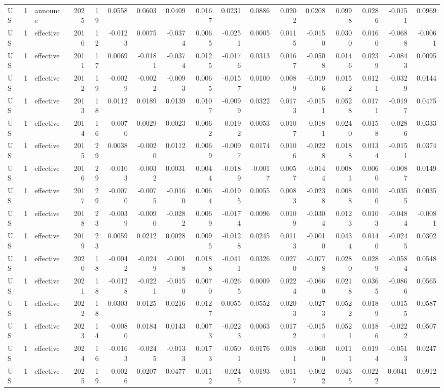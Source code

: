 \begin{tabular}{lrlrrrrrrrrrrrrrr}
US & 1 & announce & 2025 & 19 & 0.0558 & 0.0603 & 0.0409 & 0.0167 & 0.0231 & 0.0886 & 0.0202 & 0.0208 & 0.0998 & 0.0286 & -0.0151 & 0.0969 \\
US & 1 & effective & 2010 & 12 & -0.0123 & 0.0075 & -0.0374 & 0.0065 & -0.0251 & 0.0005 & 0.0115 & -0.0150 & 0.0300 & 0.0160 & -0.0688 & -0.0061 \\
US & 1 & effective & 2011 & 17 & 0.0069 & -0.0181 & -0.0374 & 0.0125 & -0.0176 & 0.0313 & 0.0167 & -0.0508 & 0.0146 & 0.0239 & -0.0843 & 0.0095 \\
US & 1 & effective & 2012 & 19 & -0.0029 & -0.0022 & -0.0093 & 0.0065 & -0.0157 & 0.0100 & 0.0089 & -0.0196 & 0.0152 & 0.0121 & -0.0329 & 0.0144 \\
US & 1 & effective & 2013 & 18 & 0.0112 & 0.0189 & 0.0139 & 0.0107 & -0.0099 & 0.0322 & 0.0173 & -0.0151 & 0.0528 & 0.0171 & -0.0197 & 0.0475 \\
US & 1 & effective & 2014 & 16 & -0.0070 & 0.0029 & 0.0023 & 0.0062 & -0.0192 & 0.0053 & 0.0107 & -0.0181 & 0.0240 & 0.0158 & -0.0286 & 0.0333 \\
US & 1 & effective & 2015 & 29 & 0.0038 & -0.0020 & 0.0112 & 0.0069 & -0.0097 & 0.0174 & 0.0106 & -0.0228 & 0.0188 & 0.0134 & -0.0151 & 0.0374 \\
US & 1 & effective & 2016 & 29 & -0.0103 & -0.0032 & 0.0031 & 0.0044 & -0.0189 & -0.0017 & 0.0057 & -0.0144 & 0.0081 & 0.0060 & -0.0087 & 0.0149 \\
US & 1 & effective & 2017 & 29 & -0.0070 & -0.0075 & -0.0160 & 0.0064 & -0.0195 & 0.0055 & 0.0083 & -0.0238 & 0.0088 & 0.0100 & -0.0355 & 0.0035 \\
US & 1 & effective & 2018 & 23 & -0.0039 & -0.0090 & -0.0282 & 0.0069 & -0.0174 & 0.0096 & 0.0109 & -0.0304 & 0.0123 & 0.0103 & -0.0484 & -0.0081 \\
US & 1 & effective & 2019 & 23 & 0.0059 & 0.0212 & 0.0028 & 0.0095 & -0.0128 & 0.0245 & 0.0113 & -0.0010 & 0.0434 & 0.0140 & -0.0245 & 0.0302 \\
US & 1 & effective & 2020 & 18 & -0.0042 & -0.0249 & -0.0018 & 0.0188 & -0.0411 & 0.0326 & 0.0270 & -0.0778 & 0.0280 & 0.0289 & -0.0584 & 0.0548 \\
US & 1 & effective & 2021 & 18 & -0.0128 & -0.0221 & -0.0150 & 0.0070 & -0.0265 & 0.0009 & 0.0224 & -0.0660 & 0.0218 & 0.0365 & -0.0866 & 0.0565 \\
US & 1 & effective & 2022 & 18 & 0.0303 & 0.0125 & 0.0216 & 0.0127 & 0.0055 & 0.0552 & 0.0203 & -0.0273 & 0.0522 & 0.0189 & -0.0155 & 0.0587 \\
US & 1 & effective & 2023 & 14 & -0.0080 & 0.0184 & 0.0143 & 0.0073 & -0.0223 & 0.0063 & 0.0172 & -0.0154 & 0.0521 & 0.0186 & -0.0222 & 0.0507 \\
US & 1 & effective & 2024 & 16 & -0.0163 & -0.0245 & -0.0133 & 0.0173 & -0.0501 & 0.0176 & 0.0181 & -0.0600 & 0.0111 & 0.0194 & -0.0513 & 0.0247 \\
US & 1 & effective & 2025 & 19 & -0.0026 & 0.0207 & 0.0477 & 0.0112 & -0.0245 & 0.0193 & 0.0117 & -0.0022 & 0.0435 & 0.0222 & 0.0041 & 0.0912 \\
\bottomrule
\end{tabular}
